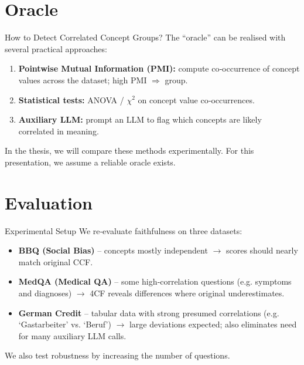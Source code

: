 \documentclass[aspectratio=169]{beamer}
\begin{document}
\section{Oracle}
\begin{frame}{How to Detect Correlated Concept Groups?}
The “oracle” can be realised with several practical approaches:
\begin{enumerate}
  \item \textbf{Pointwise Mutual Information (PMI):} compute co‑occurrence of concept values across the dataset; high PMI $\Rightarrow$ group.
  \item \textbf{Statistical tests:} ANOVA / $\chi^2$ on concept value co‑occurrences.
  \item \textbf{Auxiliary LLM:} prompt an LLM to flag which concepts are likely correlated in meaning.
\end{enumerate}
\medskip
In the thesis, we will compare these methods experimentally. For this presentation, we assume a reliable oracle exists.
\end{frame}

\section{Evaluation}
\begin{frame}{Experimental Setup}
We re‑evaluate faithfulness on three datasets:
\begin{itemize}
  \item \textbf{BBQ (Social Bias)} – concepts mostly independent $\to$ scores should nearly match original CCF.
  \item \textbf{MedQA (Medical QA)} – some high‑correlation questions (e.g. symptoms and diagnoses) $\to$ 4CF reveals differences where original underestimates.
  \item \textbf{German Credit} – tabular data with strong presumed correlations (e.g. ‘Gastarbeiter’ vs. ‘Beruf’) $\to$ large deviations expected; also eliminates need for many auxiliary LLM calls.
\end{itemize}
\medskip
We also test robustness by increasing the number of questions.
\end{frame}
\end{document}
